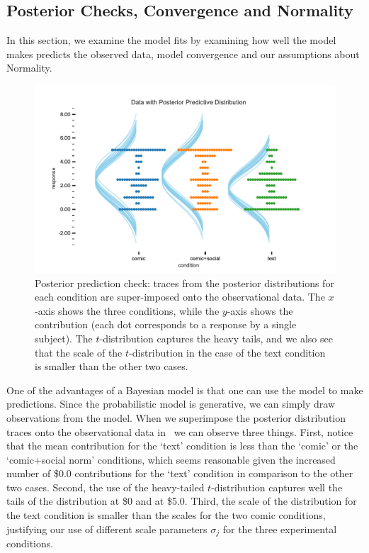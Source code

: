 \subsection{Posterior Checks, Convergence and Normality}
\label{sub:Posterior Checks, Convergence and Normality}

In this section, we examine the model fits by examining how well the model makes predicts the observed data, model convergence and our assumptions about Normality.

\begin{figure}[htb]
	\includegraphics[width=1\textwidth]{./hari-code/posterior_predictions.pdf}
    \caption{Posterior prediction check: traces from the posterior distributions for each condition are super-imposed onto the observational data. The $x$-axis shows the three conditions, while the $y$-axis shows the contribution (each dot corresponds to a response by a single subject). The $t$-distribution captures the heavy tails, and we also see that the scale of the $t$-distribution in the case of the text condition is smaller than the other two cases. }
    \label{fig:posteriorprediction}
\end{figure}

One of the advantages of a Bayesian model is that one can use the model to make predictions. Since the probabilistic model is generative, we can simply draw observations from the model. When we superimpose the posterior distribution traces onto the observational data in~ we can observe three things. First, notice that the mean contribution for the `text' condition is less than the `comic' or the `comic+social norm' conditions, which seems reasonable given the increased number of \$0.0 contributions for the `text' condition in comparison to the other two cases. Second, the use of the heavy-tailed $t$-distribution captures well the tails of the distribution at \$0 and at \$5.0. Third, the scale of the distribution for the text condition is smaller than the scales for the two comic conditions, justifying our use of different scale parameters $\sigma_j$ for the three experimental conditions.

